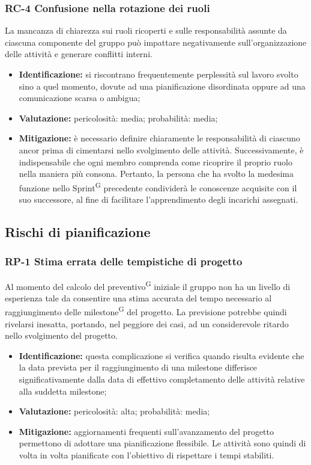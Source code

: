 \documentclass[8pt]{article}
\newcommand{\glossterm}[1]{#1\textsuperscript{G}} %
\begin{document}
\subsubsection{RC-4 Confusione nella rotazione dei ruoli}
La mancanza di chiarezza sui ruoli ricoperti e sulle responsabilità assunte da ciascuna componente del gruppo può impattare negativamente sull'organizzazione delle attività e generare conflitti interni.
\begin{itemize}
\setlength\itemsep{0em}
    \item \textbf{Identificazione:} si riscontrano frequentemente perplessità sul lavoro svolto sino a quel momento, dovute ad una pianificazione disordinata oppure ad una comunicazione scarsa o ambigua;
    \item \textbf{Valutazione:} pericolosità: media; probabilità: media;
    \item \textbf{Mitigazione:} è necessario definire chiaramente le responsabilità di ciascuno ancor prima di cimentarsi nello svolgimento delle attività. Successivamente, è indispensabile che ogni membro comprenda come ricoprire il proprio ruolo nella maniera più consona. Pertanto, la persona che ha svolto la medesima funzione nello \glossterm{Sprint} precedente condividerà le conoscenze acquisite con il suo successore, al fine di facilitare l'apprendimento degli incarichi assegnati.
\end{itemize}

\subsection{Rischi di pianificazione}
\subsubsection{RP-1 Stima errata delle tempistiche di progetto}
Al momento del calcolo del \glossterm{preventivo} iniziale il gruppo non ha un livello di esperienza tale da consentire una stima accurata del tempo necessario al raggiungimento delle \glossterm{milestone} del progetto. La previsione potrebbe quindi rivelarsi inesatta, portando, nel peggiore dei casi, ad un considerevole ritardo nello svolgimento del progetto.
\begin{itemize}
\setlength\itemsep{0em}
    \item \textbf{Identificazione:} questa complicazione si verifica quando risulta evidente che la data prevista per il raggiungimento di una milestone differisce significativamente dalla data di effettivo completamento delle attività relative alla suddetta milestone;
    \item \textbf{Valutazione:} pericolosità: alta; probabilità: media;
    \item \textbf{Mitigazione:} aggiornamenti frequenti sull'avanzamento del progetto permettono di adottare una pianificazione flessibile. Le attività sono quindi di volta in volta pianificate con l'obiettivo di rispettare i tempi stabiliti.
\end{itemize}
\end{document}
